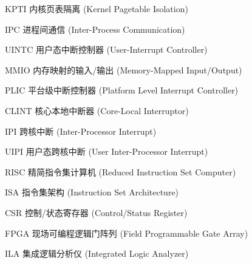 
\begin{denotation}[3cm]
  \item[KPTI] {内核页表隔离 (Kernel Pagetable Isolation)}
  \item[IPC] {进程间通信 (Inter-Process Communication)}
  \item[UINTC] {用户态中断控制器 (User-Interrupt Controller)}
  \item[MMIO] {内存映射的输入/输出 (Memory-Mapped Input/Output)}  
  \item[PLIC] {平台级中断控制器 (Platform Level Interrupt Controller)}
  \item[CLINT] {核心本地中断器 (Core-Local Interruptor)}
  \item[IPI] {跨核中断 (Inter-Processor Interrupt)}
  \item[UIPI] {用户态跨核中断 (User Inter-Processor Interrupt)}
  \item[RISC] {精简指令集计算机 (Reduced Instruction Set Computer)}
  \item[ISA] {指令集架构 (Instruction Set Architecture)}
  \item[CSR] {控制/状态寄存器 (Control/Status Register)}
  \item[FPGA] {现场可编程逻辑门阵列 (Field Programmable Gate Array)}
  \item[ILA] {集成逻辑分析仪 (Integrated Logic Analyzer)} 
\end{denotation}
